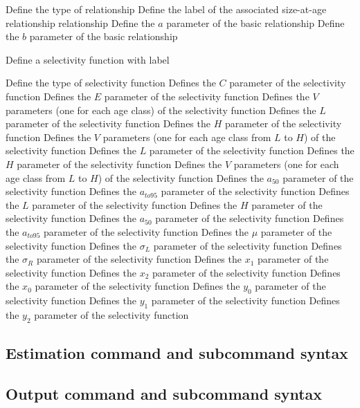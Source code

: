  {Define the type of relationship}
 {Define the label of the associated size-at-age relationship relationship}
 {Define the $a$ parameter of the basic relationship}
 {Define the $b$ parameter of the basic relationship}
\par {} {Define a selectivity function with label}\par \par
{} {Define the type of selectivity function}
 {Defines the $C$ parameter of the selectivity function}
 {Defines the $E$ parameter of the selectivity function}
 {Defines the $V$ parameters (one for each age class) of the selectivity function}
 {Defines the $L$ parameter of the selectivity function}
 {Defines the $H$ parameter of the selectivity function}
 {Defines the $V$ parameters (one for each age class from $L$ to $H$) of the selectivity function}
 {Defines the $L$ parameter of the selectivity function}
 {Defines the $H$ parameter of the selectivity function}
 {Defines the $V$ parameters (one for each age class from $L$ to $H$) of the selectivity function}
 {Defines the $a_{50}$ parameter of the selectivity function}
 {Defines the $a_{to95}$ parameter of the selectivity function}
 {Defines the $L$ parameter of the selectivity function}
 {Defines the $H$ parameter of the selectivity function}
 {Defines the $a_{50}$ parameter of the selectivity function}
 {Defines the $a_{to95}$ parameter of the selectivity function}
 {Defines the $\mu$ parameter of the selectivity function}
 {Defines the $\sigma_L$ parameter of the selectivity function}
 {Defines the $\sigma_R$ parameter of the selectivity function}
 {Defines the $x_1$ parameter of the selectivity function}
 {Defines the $x_2$ parameter of the selectivity function}
 {Defines the $x_0$ parameter of the selectivity function}
 {Defines the $y_0$ parameter of the selectivity function}
 {Defines the $y_1$ parameter of the selectivity function}
 {Defines the $y_2$ parameter of the selectivity function}
\subsection{Estimation command and subcommand syntax}
\subsection{Output command and subcommand syntax}
